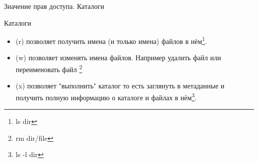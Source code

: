 \begin{frame}{Значение прав доступа. Каталоги}
  \begin{block}{Каталоги}
    \begin{itemize}
      \item \alert{(r)} позволяет получить имена (и только имена) файлов в нём\footnote{ls dir}. 
      \item \alert{(w)} позволяет изменять имена файлов. Например удалить файл или переименовать файл \footnote{rm dir/file} 
      \item \alert{(x)} позволяет "выполнить" каталог\newline
	то есть заглянуть в метаданные  и получить полную информацию о каталоге и файлах в нём\footnote{ls -l dir}.
    \end{itemize}
  \end{block}
\end{frame}
